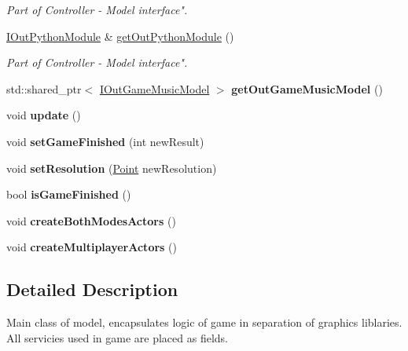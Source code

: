 \begin{DoxyCompactItemize}
\begin{DoxyCompactList}\small\item\em Part of Controller -\/ Model interface". \end{DoxyCompactList}\item 
\hyperlink{classIOutPythonModule}{I\+Out\+Python\+Module} \& \hyperlink{classGame_a957736283b0b0a9301619b8572dd0f3a}{get\+Out\+Python\+Module} ()
\begin{DoxyCompactList}\small\item\em Part of Controller -\/ Model interface". \end{DoxyCompactList}\item 
std\+::shared\+\_\+ptr$<$ \hyperlink{classIOutGameMusicModel}{I\+Out\+Game\+Music\+Model} $>$ {\bfseries get\+Out\+Game\+Music\+Model} ()\hypertarget{classGame_aae72b8dd502d4ff5668227dbd973273e}{}\label{classGame_aae72b8dd502d4ff5668227dbd973273e}

\item 
void {\bfseries update} ()\hypertarget{classGame_a79df6376b332d63c9eca0dcee30305c3}{}\label{classGame_a79df6376b332d63c9eca0dcee30305c3}

\item 
void {\bfseries set\+Game\+Finished} (int new\+Result)\hypertarget{classGame_a4d87901dd606b9f465ca0ff3ac85b801}{}\label{classGame_a4d87901dd606b9f465ca0ff3ac85b801}

\item 
void {\bfseries set\+Resolution} (\hyperlink{classPoint}{Point} new\+Resolution)\hypertarget{classGame_a507e1c1cab6653f2f7727ac020b46db2}{}\label{classGame_a507e1c1cab6653f2f7727ac020b46db2}

\item 
bool {\bfseries is\+Game\+Finished} ()\hypertarget{classGame_ac210ecbd163be2aa4ad7ae0871656874}{}\label{classGame_ac210ecbd163be2aa4ad7ae0871656874}

\item 
void {\bfseries create\+Both\+Modes\+Actors} ()\hypertarget{classGame_a138adec32f0567e7b027d23e5efee9bc}{}\label{classGame_a138adec32f0567e7b027d23e5efee9bc}

\item 
void {\bfseries create\+Multiplayer\+Actors} ()\hypertarget{classGame_a059bb7a37176b2a121b3309a114fc8bc}{}\label{classGame_a059bb7a37176b2a121b3309a114fc8bc}

\end{DoxyCompactItemize}


\subsection{Detailed Description}
Main class of model, encapsulates logic of game in separation of graphics liblaries. All servicies used in game are placed as fields. 

